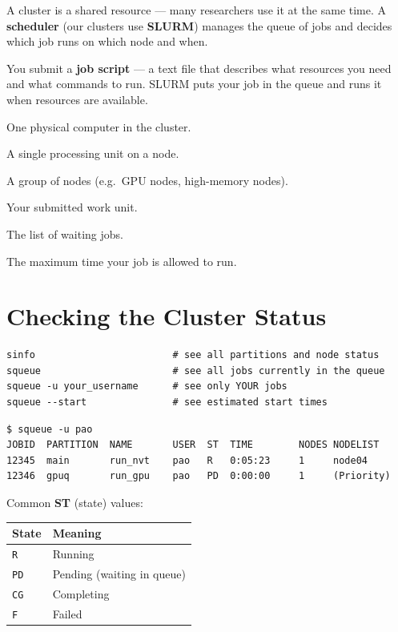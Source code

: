 \documentclass[12pt,a4paper]{article}
\newcommand{\defbox}[2]{%
  \begin{tcolorbox}[defstyle, title={#1}]
    #2
  \end{tcolorbox}
}
\begin{document}
A cluster is a shared resource --- many researchers use it at the same time.
A \textbf{scheduler} (our clusters use \textbf{SLURM}) manages the queue of
jobs and decides which job runs on which node and when.

You submit a \textbf{job script} --- a text file that describes what resources
you need and what commands to run. SLURM puts your job in the queue and runs
it when resources are available.

\defbox{Key concepts}{
  \begin{description}[noitemsep]
    \item[Node] One physical computer in the cluster.
    \item[Core / CPU] A single processing unit on a node.
    \item[Partition] A group of nodes (e.g.\ GPU nodes, high-memory nodes).
    \item[Job] Your submitted work unit.
    \item[Queue] The list of waiting jobs.
    \item[Walltime] The maximum time your job is allowed to run.
  \end{description}
}

\section{Checking the Cluster Status}

\begin{lstlisting}[style=bash]
sinfo                        # see all partitions and node status
squeue                       # see all jobs currently in the queue
squeue -u your_username      # see only YOUR jobs
squeue --start               # see estimated start times
\end{lstlisting}

\begin{lstlisting}[style=terminal]
$ squeue -u pao
JOBID  PARTITION  NAME       USER  ST  TIME        NODES NODELIST
12345  main       run_nvt    pao   R   0:05:23     1     node04
12346  gpuq       run_gpu    pao   PD  0:00:00     1     (Priority)
\end{lstlisting}

Common \textbf{ST} (state) values:

\begin{center}
\begin{tabular}{ll}
\toprule
\textbf{State} & \textbf{Meaning} \\
\midrule
\texttt{R}  & Running \\
\texttt{PD} & Pending (waiting in queue) \\
\texttt{CG} & Completing \\
\texttt{F}  & Failed \\
\bottomrule
\end{tabular}
\end{center}
\end{document}
